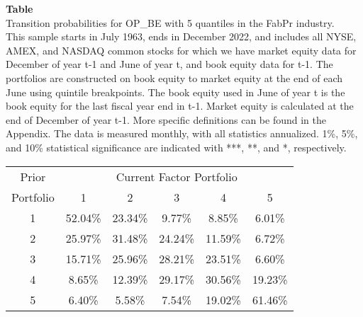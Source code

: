 \begin{table*}[ht!]
\raggedright
{}
\label{tab: transition_probs_OP_BE_FabPr_with_5_quantiles}
\textbf{Table \thetable} \\
Transition probabilities for OP_BE with 5 quantiles in the FabPr industry. \\
\hspace*{1em}This sample starts in July 1963, ends in December 2022, and includes all NYSE, AMEX, and NASDAQ common stocks for which we have market equity data for December of year t-1 and June of year t, and book equity data for t-1. The portfolios are constructed on book equity to market equity at the end of each June using quintile breakpoints.  The book equity used in June of year t is the book equity for the last fiscal year end in t-1.  Market equity is calculated at the end of December of year t-1.  More specific definitions can be found in the Appendix.  The data is measured monthly, with all statistics annualized.  1\%, 5\%, and 10\% statistical significance are indicated with ***, **, and *, respectively. \\
\vspace{0.5em}
\centering
\begin{adjustbox}{max width=\textwidth}
\begin{tabular}{@{}cccccc@{}}
\toprule
Prior & \multicolumn{5}{c}{Current Factor Portfolio} \\
Portfolio & 1 & 2 & 3 & 4 & 5 \\
\midrule
1 & 52.04\% & 23.34\% & 9.77\% & 8.85\% & 6.01\% \\
2 & 25.97\% & 31.48\% & 24.24\% & 11.59\% & 6.72\% \\
3 & 15.71\% & 25.96\% & 28.21\% & 23.51\% & 6.60\% \\
4 & 8.65\% & 12.39\% & 29.17\% & 30.56\% & 19.23\% \\
5 & 6.40\% & 5.58\% & 7.54\% & 19.02\% & 61.46\% \\
\bottomrule
\end{tabular}
\end{adjustbox}
\end{table*}